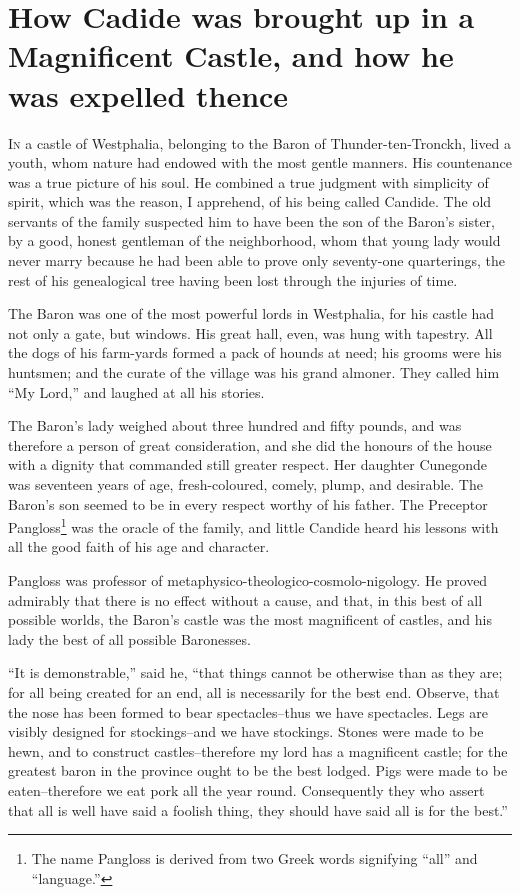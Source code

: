 \chapter{How Cadide was brought up in a Magnificent Castle, and how he was expelled thence}
\lettrine[lraise=0.1,nindent=0em,slope=-.5em]{I}{n} a castle of Westphalia, belonging to the Baron of Thunder-ten-Tronckh, lived a youth, whom nature had endowed with the most gentle manners. His countenance was a true picture of his soul. He 
combined a true judgment with simplicity of spirit, which was the reason, I apprehend, of his being called Candide. The old servants of the family suspected him to have been the son of the Baron's sister, by a good, honest gentleman of the neighborhood, whom that young lady would never marry because he had been able to prove only seventy-one quarterings, the rest of his genealogical tree having been lost through the injuries of time.

The Baron was one of the most powerful lords in Westphalia, for his castle had not only a gate, but windows. His great hall, even, was hung with tapestry. All the dogs of his farm-yards formed a pack of hounds at need; his grooms were his huntsmen; and the curate of the village was his grand almoner. They called him ``My Lord,'' and laughed at all his stories.

The Baron's lady weighed about three hundred and fifty pounds, and was therefore a person of great consideration, and she did the honours of the house with a dignity that commanded still greater respect. Her daughter Cunegonde was seventeen years of age, fresh-coloured, comely, plump, and desirable. The Baron's son seemed to be in every respect worthy of his father. The Preceptor Pangloss\footnote{The name Pangloss is derived from two Greek words signifying ``all'' and ``language.''} was the oracle of the family, and little Candide heard his lessons with all the good faith of his age and character.

Pangloss was professor of metaphysico-theologico-cosmolo-nigology. He proved admirably that there is no effect without a cause, and that, in this best of all possible worlds, the Baron's castle was the most magnificent of castles, and his lady the best of all possible Baronesses.

``It is demonstrable,'' said he, ``that things cannot be otherwise than as they are; for all being created for an end, all is necessarily for the best end. Observe, that the nose has been formed to bear spectacles--thus we have spectacles. Legs are visibly designed for stockings--and we have stockings. Stones were made to be hewn, and to construct castles--therefore my lord has a magnificent castle; for the greatest baron in the province ought to be the best lodged. Pigs were made to be eaten--therefore we eat pork all the year round. Consequently they who assert that all is well have said a foolish thing, they should have said all is for the best.''


